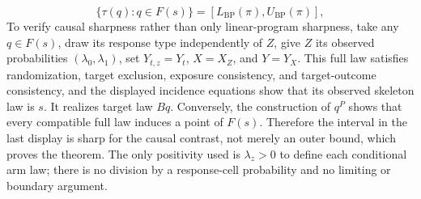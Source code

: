 \[
\{\tau(q):q\in F(s)\}
=[L_{\mathrm{BP}}(\pi),U_{\mathrm{BP}}(\pi)],
\]
To verify causal sharpness rather than only linear-program sharpness, take any \(q\in F(s)\), draw its response type independently of \(Z\), give \(Z\) its observed probabilities \((\lambda_0,\lambda_1)\), set \(Y_{t,z}=Y_t\), \(X=X_Z\), and \(Y=Y_X\). This full law satisfies randomization, target exclusion, exposure consistency, and target-outcome consistency, and the displayed incidence equations show that its observed skeleton law is \(s\). It realizes target law \(Bq\). Conversely, the construction of \(q^P\) shows that every compatible full law induces a point of \(F(s)\). Therefore the interval in the last display is sharp for the causal contrast, not merely an outer bound, which proves the theorem. The only positivity used is \(\lambda_z>0\) to define each conditional arm law; there is no division by a response-cell probability and no limiting or boundary argument.
